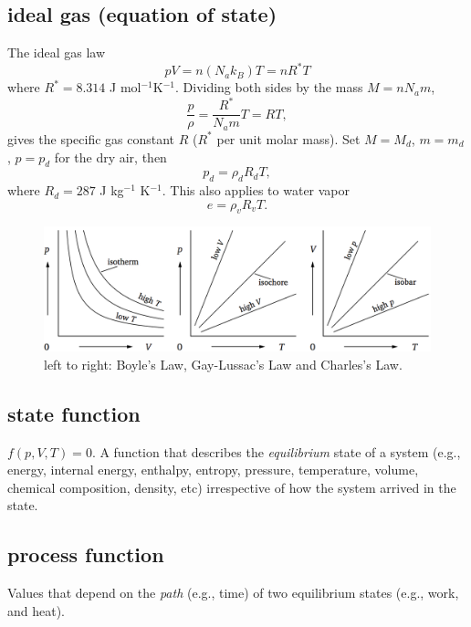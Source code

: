 \subsection{ideal gas (equation of state)}
\begin{defn*} The ideal gas law 
\begin{equation}
   p V = n (N_a k_B) T = n R^* T
\end{equation}
where $R^* = 8.314$ J mol$^{-1}$K$^{-1}$. Dividing both sides by the mass $M = n N_a m$,
\begin{equation}
   \frac{p}{\rho} = \frac{R^*}{N_a m} T = R T,
\end{equation}
gives the specific gas constant $R$ ($R^*$ per unit molar mass). Set $M=M_d$, $m=m_d$, $p=p_d$ for the dry air, then 
\begin{equation}
   p_d = \rho_d R_d T,
\end{equation}
where $R_d = 287$ J kg$^{-1}$ K$^{-1}$. This also applies to water vapor
\begin{equation}
   e = \rho_v R_v T.
\end{equation}

\begin{figure}[H]
   \includegraphics[width=1\textwidth, height=0.3\textwidth]{pVT.png}
   \caption{\label{fig:pVT}
      left to right: Boyle's Law, Gay-Lussac's Law and Charles's Law.}
\end{figure}
\end{defn*}



\subsection{state function}
\begin{defn*} $f(p,V,T)=0$.  A function that describes the \emph{equilibrium} state of a system (e.g., energy,
internal energy, enthalpy, entropy, pressure, temperature, volume, chemical composition, density,
etc) irrespective of how the system arrived in the state. 
\end{defn*}

\subsection{process function}
\begin{defn*} Values that depend on the \emph{path} (e.g., time) of two equilibrium states (e.g.,
work, and heat).
\end{defn*}



